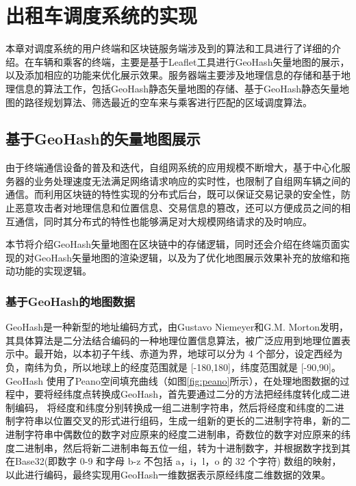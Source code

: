 \chapter{出租车调度系统的实现}

本章对调度系统的用户终端和区块链服务端涉及到的算法和工具进行了详细的介绍。在车辆和乘客的终端，主要是基于Leaflet工具进行GeoHash矢量地图的展示，以及添加相应的功能来优化展示效果。服务器端主要涉及地理信息的存储和基于地理信息的算法工作，包括GeoHash静态矢量地图的存储、基于GeoHash静态矢量地图的路径规划算法、筛选最近的空车来与乘客进行匹配的区域调度算法。

\section{基于GeoHash的矢量地图展示}

由于终端通信设备的普及和迭代，自组网系统的应用规模不断增大，基于中心化服务器的业务处理速度无法满足网络请求响应的实时性，也限制了自组网车辆之间的通信。而利用区块链的特性实现的分布式后台，既可以保证交易记录的安全性，防止恶意攻击者对地理信息和位置信息、交易信息的篡改，还可以方便成员之间的相互通信，同时其分布式的特性也能够满足对大规模网络请求的及时响应。

本节将介绍GeoHash矢量地图在区块链中的存储逻辑，同时还会介绍在终端页面实现的对GeoHash矢量地图的渲染逻辑，以及为了优化地图展示效果补充的放缩和拖动功能的实现逻辑。

\subsection{基于GeoHash的地图数据}

GeoHash是一种新型的地址编码方式，由Gustavo Niemeyer和G.M. Morton发明，其具体算法是二分法结合编码的一种地理位置信息算法，被广泛应用到地理位置表示中。最开始，以本初子午线、赤道为界，地球可以分为 4 个部分，设定西经为负，南纬为负，所以地球上的经度范围就是 [-180,180]，纬度范围就是 [-90,90]。GeoHash 使用了Peano空间填充曲线（如图\ref{fig:peano}所示），在处理地图数据的过程中，要将经纬度点转换成GeoHash，首先要通过二分的方法把经纬度转化成二进制编码，
将经度和纬度分别转换成一组二进制字符串，然后将经度和纬度的二进制字符串以位置交叉的形式进行组码，生成一组新的更长的二进制字符串，新的二进制字符串中偶数位的数字对应原来的经度二进制串，奇数位的数字对应原来的纬度二进制串，然后将新二进制串每五位一组，转为十进制数字，并根据数字找到其在Base32(即数字 0-9 和字母 b-z 不包括 a，i，l，o 的 32 个字符) 数组的映射，以此进行编码，最终实现用GeoHash一维数据表示原经纬度二维数据的效果。

